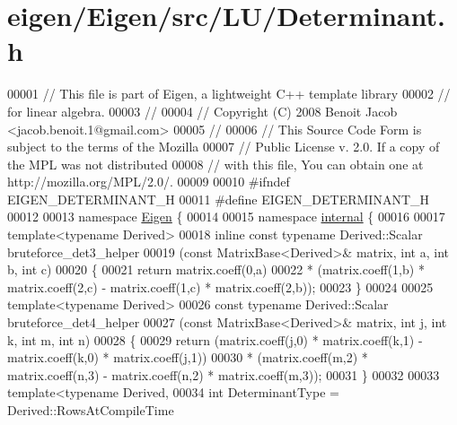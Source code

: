\hypertarget{eigen_2_eigen_2src_2_l_u_2_determinant_8h_source}{}\section{eigen/\+Eigen/src/\+L\+U/\+Determinant.h}
\label{eigen_2_eigen_2src_2_l_u_2_determinant_8h_source}

\begin{DoxyCode}
00001 \textcolor{comment}{// This file is part of Eigen, a lightweight C++ template library}
00002 \textcolor{comment}{// for linear algebra.}
00003 \textcolor{comment}{//}
00004 \textcolor{comment}{// Copyright (C) 2008 Benoit Jacob <jacob.benoit.1@gmail.com>}
00005 \textcolor{comment}{//}
00006 \textcolor{comment}{// This Source Code Form is subject to the terms of the Mozilla}
00007 \textcolor{comment}{// Public License v. 2.0. If a copy of the MPL was not distributed}
00008 \textcolor{comment}{// with this file, You can obtain one at http://mozilla.org/MPL/2.0/.}
00009 
00010 \textcolor{preprocessor}{#ifndef EIGEN\_DETERMINANT\_H}
00011 \textcolor{preprocessor}{#define EIGEN\_DETERMINANT\_H}
00012 
00013 \textcolor{keyword}{namespace }\hyperlink{namespace_eigen}{Eigen} \{ 
00014 
00015 \textcolor{keyword}{namespace }\hyperlink{namespaceinternal}{internal} \{
00016 
00017 \textcolor{keyword}{template}<\textcolor{keyword}{typename} Derived>
00018 \textcolor{keyword}{inline} \textcolor{keyword}{const} \textcolor{keyword}{typename} Derived::Scalar bruteforce\_det3\_helper
00019 (\textcolor{keyword}{const} MatrixBase<Derived>& matrix, \textcolor{keywordtype}{int} a, \textcolor{keywordtype}{int} b, \textcolor{keywordtype}{int} c)
00020 \{
00021   \textcolor{keywordflow}{return} matrix.coeff(0,a)
00022          * (matrix.coeff(1,b) * matrix.coeff(2,c) - matrix.coeff(1,c) * matrix.coeff(2,b));
00023 \}
00024 
00025 \textcolor{keyword}{template}<\textcolor{keyword}{typename} Derived>
00026 \textcolor{keyword}{const} \textcolor{keyword}{typename} Derived::Scalar bruteforce\_det4\_helper
00027 (\textcolor{keyword}{const} MatrixBase<Derived>& matrix, \textcolor{keywordtype}{int} j, \textcolor{keywordtype}{int} k, \textcolor{keywordtype}{int} m, \textcolor{keywordtype}{int} n)
00028 \{
00029   \textcolor{keywordflow}{return} (matrix.coeff(j,0) * matrix.coeff(k,1) - matrix.coeff(k,0) * matrix.coeff(j,1))
00030        * (matrix.coeff(m,2) * matrix.coeff(n,3) - matrix.coeff(n,2) * matrix.coeff(m,3));
00031 \}
00032 
00033 \textcolor{keyword}{template}<\textcolor{keyword}{typename} Derived,
00034          \textcolor{keywordtype}{int} DeterminantType = Derived::RowsAtCompileTime

\end{DoxyCode}
